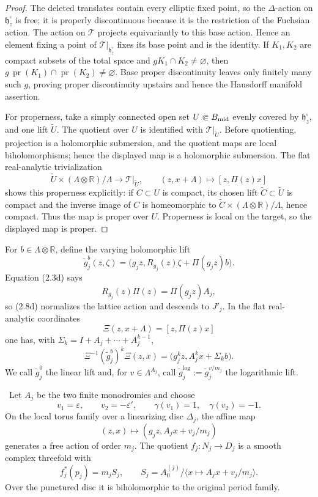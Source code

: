\begin{proof}
The deleted translates contain every elliptic fixed point, so the
\(\Delta\)-action on \(\mathfrak h_z^\circ\) is free; it is properly
discontinuous because it is the restriction of the Fuchsian action.  The
action on \(\mathcal T\) projects equivariantly to this base action.  Hence
an element fixing a point of \(\mathcal T|_{\mathfrak h_z^\circ}\) fixes
its base point and is the identity.  If \(K_1,K_2\) are compact subsets of
the total space and \(gK_1\cap K_2\ne\varnothing\), then
\(g\,\operatorname{pr}(K_1)\cap\operatorname{pr}(K_2)\ne\varnothing\).
Base proper discontinuity leaves only finitely many such \(g\), proving
proper discontinuity upstairs and hence the Hausdorff manifold assertion.

For properness, take a simply connected open set \(U\Subset B_{\rm mid}\)
evenly covered by \(\mathfrak h_z^\circ\), and one lift \(\widetilde U\).
The quotient over \(U\) is identified with
\(\mathcal T|_{\widetilde U}\).  Before quotienting, projection is a
holomorphic submersion, and the quotient maps are local biholomorphisms;
hence the displayed map is a holomorphic submersion.  The flat real-analytic trivialization
\[
 \widetilde U\times(\Lambda\otimes\mathbb R)/\Lambda
 \longrightarrow\mathcal T|_{\widetilde U},\qquad
 (z,x+\Lambda)\longmapsto[z,\Pi(z)x]
\]
shows this properness explicitly: if \(C\subset U\) is compact, its chosen
lift \(\widetilde C\subset\widetilde U\) is compact and the inverse image of
\(C\) is homeomorphic to
\(\widetilde C\times(\Lambda\otimes\mathbb R)/\Lambda\), hence compact.
Thus the map is proper over \(U\).  Properness is local on the target, so
the displayed map is proper.
\end{proof}

For \(b\in\Lambda\otimes\mathbb R\), define the varying holomorphic lift
\[
 \widetilde g_j^{b}(z,\zeta)=
 \bigl(g_jz,R_{g_j}(z)\zeta+\Pi(g_jz)b\bigr).
 \tag{2.8d}
\]
Equation (2.3d) says
\[
 R_{g_j}(z)\Pi(z)=\Pi(g_jz)A_j,
 \tag{2.8e}
\]
so (2.8d) normalizes the lattice action and descends to \(J'_j\).  In the
flat real-analytic coordinates
\[
 \Xi(z,x+\Lambda)=[z,\Pi(z)x]
\]
one has, with \(\Sigma_k=I+A_j+\cdots+A_j^{k-1}\),
\[
 \Xi^{-1}(\widetilde g_j^{b})^k\Xi(z,x)
 =\bigl(g_j^kz,A_j^kx+\Sigma_kb\bigr).
 \tag{2.8f}
\]
We call \(\widetilde g_j^{0}\) the linear lift and, for
\(v\in\Lambda^{A_j}\), call
\(\widetilde g_j^{\log}:=\widetilde g_j^{v/m_j}\) the logarithmic lift.

\begin{proposition}
\label{prop:candidate-finite-fillings}
\Verified\ Let \(A_j\) be the two finite monodromies and choose
\[
 v_1=\varepsilon,\qquad v_2=-\varepsilon',
 \qquad \gamma(v_1)=1,\quad\gamma(v_2)=-1.
\]
On the local torus family over a linearizing disc \(\Delta_j\), the affine
map
\[
 (z,x)\longmapsto(g_jz,A_jx+v_j/m_j)
\tag{2.9}
\]
generates a free action of order \(m_j\).  The quotient
\(f_j:N_j\to D_j\) is a smooth complex threefold with
\[
 f_j^*(p_j)=m_jS_j,\qquad
 S_j=A_0^{(j)}/\langle x\mapsto A_jx+v_j/m_j\rangle.
\tag{2.10}
\]
Over the punctured disc it is biholomorphic to the original period family.
\end{proposition}

